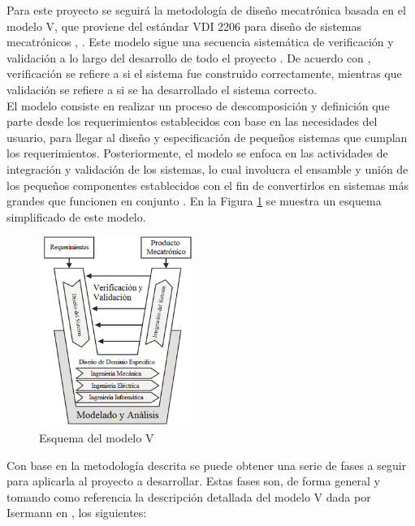 Para este proyecto se seguirá la metodología de diseño mecatrónica basada en el modelo V, que proviene del estándar VDI 2206 para diseño de sistemas mecatrónicos \cite{M11}, \cite{M12}. Este modelo sigue una secuencia sistemática de verificación y validación a lo largo del desarrollo de todo el proyecto \cite{M13}. De acuerdo con \cite{M14}, verificación se refiere a si el sistema fue construido correctamente, mientras que validación se refiere a si se ha desarrollado el sistema correcto.\\

El modelo consiste en realizar un proceso de descomposición y definición que parte desde los requerimientos establecidos con base en las necesidades del usuario, para llegar al diseño y especificación de pequeños sistemas que cumplan los requerimientos. Posteriormente, el modelo se enfoca en las actividades de integración y validación de los sistemas, lo cual involucra el ensamble y unión de los pequeños componentes establecidos con el fin de convertirlos en sistemas más grandes que funcionen en conjunto \cite{M14}. En la Figura \ref{fig:modeloV} se muestra un esquema simplificado de este modelo.\\

\begin{figure}[H]
	\centering
	\includegraphics[width=5cm]{imagenes/modeloV}
	\caption{Esquema del modelo V \cite{I3:2013:Online}}
	\label{fig:modeloV}
\end{figure}

Con base en la metodología descrita se puede obtener una serie de fases a seguir para aplicarla al proyecto a desarrollar. Estas fases son, de forma general y tomando como referencia la descripción detallada del modelo V dada por Isermann en \cite{M13}, los siguientes:

